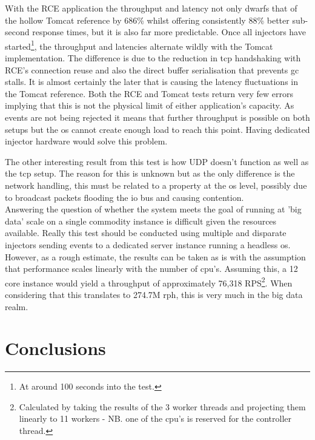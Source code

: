 \documentclass[a4paper,11pt]{scrreprt}
\begin{document}
With the RCE application the throughput and latency not only dwarfs that of the hollow Tomcat reference by 686\% whilst offering consistently 88\% better sub-second response times, but it is also far more predictable. Once all injectors have started\footnote{At around 100 seconds into the test.}, the throughput and latencies alternate wildly with the Tomcat implementation. The difference is due to the reduction in \acrshort{tcp} handshaking with RCE's connection reuse and also the direct buffer serialisation that prevents \acrshort{gc} stalls. It is almost certainly the later that is causing the latency fluctuations in the Tomcat reference. Both the RCE and Tomcat tests return very few errors implying that this is not the physical limit of either application's capacity. As events are not being rejected it means that further throughput is possible on both setups but the \acrshort{os} cannot create enough load to reach this point. Having dedicated injector hardware would solve this problem. \

The other interesting result from this test is how UDP doesn't function as well as the \acrshort{tcp} setup. The reason for this is unknown but as the only difference is the network handling, this must be related to a property at the \acrshort{os} level, possibly due to broadcast packets flooding the \acrshort{io} bus and causing contention. \\

Answering the question of whether the system meets the goal of running at 'big data' scale on a single commodity instance is difficult given the resources available. Really this test should be conducted using multiple and disparate injectors sending events to a dedicated server instance running a headless \acrshort{os}. However, as a rough estimate, the results can be taken as is with the assumption that performance scales linearly with the number of \acrshort{cpu}'s. Assuming this, a 12 core instance would yield a throughput of approximately 76,318 RPS\footnote{Calculated by taking the results of the 3 worker threads and projecting them linearly to 11 workers - NB. one of the \acrshort{cpu}'s is reserved for the controller thread.}. When considering that this translates to 274.7M \acrshort{rph}, this is very much in the big data realm.

\chapter{Conclusions}
\end{document}
